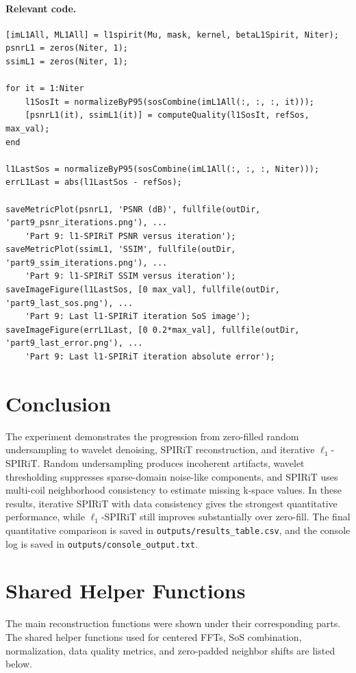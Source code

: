 \documentclass[11pt]{article}
\begin{document}
\paragraph{Relevant code.}
\begin{lstlisting}
[imL1All, ML1All] = l1spirit(Mu, mask, kernel, betaL1Spirit, Niter);
psnrL1 = zeros(Niter, 1);
ssimL1 = zeros(Niter, 1);

for it = 1:Niter
    l1SosIt = normalizeByP95(sosCombine(imL1All(:, :, :, it)));
    [psnrL1(it), ssimL1(it)] = computeQuality(l1SosIt, refSos, max_val);
end

l1LastSos = normalizeByP95(sosCombine(imL1All(:, :, :, Niter)));
errL1Last = abs(l1LastSos - refSos);

saveMetricPlot(psnrL1, 'PSNR (dB)', fullfile(outDir, 'part9_psnr_iterations.png'), ...
    'Part 9: l1-SPIRiT PSNR versus iteration');
saveMetricPlot(ssimL1, 'SSIM', fullfile(outDir, 'part9_ssim_iterations.png'), ...
    'Part 9: l1-SPIRiT SSIM versus iteration');
saveImageFigure(l1LastSos, [0 max_val], fullfile(outDir, 'part9_last_sos.png'), ...
    'Part 9: Last l1-SPIRiT iteration SoS image');
saveImageFigure(errL1Last, [0 0.2*max_val], fullfile(outDir, 'part9_last_error.png'), ...
    'Part 9: Last l1-SPIRiT iteration absolute error');
\end{lstlisting}

\section{Conclusion}
The experiment demonstrates the progression from zero-filled random undersampling to wavelet denoising, SPIRiT reconstruction, and iterative $\ell_1$-SPIRiT. Random undersampling produces incoherent artifacts, wavelet thresholding suppresses sparse-domain noise-like components, and SPIRiT uses multi-coil neighborhood consistency to estimate missing k-space values. In these results, iterative SPIRiT with data consistency gives the strongest quantitative performance, while $\ell_1$-SPIRiT still improves substantially over zero-fill. The final quantitative comparison is saved in \texttt{outputs/results\_table.csv}, and the console log is saved in \texttt{outputs/console\_output.txt}.

\clearpage
\section{Shared Helper Functions}
The main reconstruction functions were shown under their corresponding parts. The shared helper functions used for centered FFTs, SoS combination, normalization, data quality metrics, and zero-padded neighbor shifts are listed below.
\end{document}

